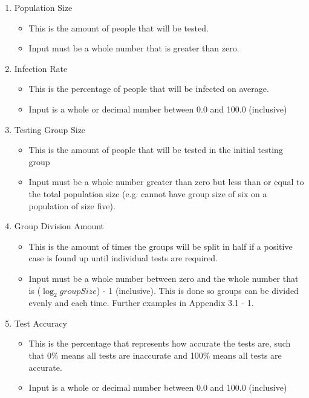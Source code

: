 \documentclass[letterpaper, 10pt,DIV=13]{scrartcl}
\numberwithin{equation}{section} %
\numberwithin{figure}{section} %
\numberwithin{table}{section} %
\begin{document}
\begin{enumerate}
   \item Population Size
   \begin{itemize}
     \item This is the amount of people that will be tested.
     \item Input must be a whole number that is greater than zero.
   \end{itemize}
      \item Infection Rate
   \begin{itemize}
     \item This is the percentage of people that will be infected on average.
     \item Input is a whole or decimal number between 0.0 and 100.0 (inclusive)
   \end{itemize}
      \item Testing Group Size
   \begin{itemize}
     \item This is the amount of people that will be tested in the initial testing group
     \item Input must be a whole number greater than zero but less than or equal to the total population size (e.g. cannot have group size of six on a population of size five).
   \end{itemize}
      \item Group Division Amount
   \begin{itemize}
     \item This is the amount of times the groups will be split in half if a positive case is found up until individual tests are required.
     \item Input must be a whole number between zero and the whole number that is ($\log_2 groupSize$) - 1 (inclusive).  This is done so groups can be divided evenly and each time.  Further examples in Appendix 3.1 - 1.
   \end{itemize}
      \item Test Accuracy
   \begin{itemize}
     \item This is the percentage that represents how accurate the tests are, such that 0\% means all tests are inaccurate and 100\% means all tests are accurate.
     \item Input is a whole or decimal number between 0.0 and 100.0 (inclusive)
   \end{itemize}
\end{enumerate}
\end{document}
